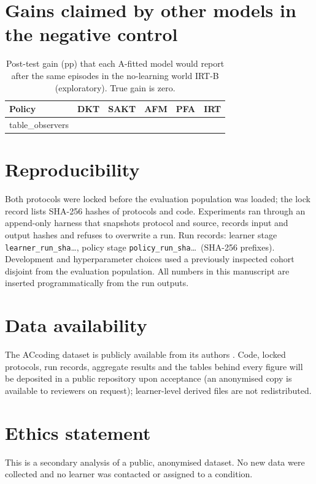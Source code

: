 \documentclass[a4paper,preprint,12pt,authoryear]{elsarticle}
\begin{document}
\section{Gains claimed by other models in the negative control}\label{app:observers}

\begin{table}[H]
\centering
\caption{Post-test gain (pp) that each A-fitted model would report after the same episodes in the no-learning world IRT-B (exploratory). True gain is zero.}
\label{tab:observers}
\small
\begin{tabular}{lrrrrr}
\toprule
Policy & DKT & SAKT & AFM & PFA & IRT \\
\midrule
{{table_observers}}
\bottomrule
\end{tabular}
\end{table}

\section{Reproducibility}\label{app:repro}

Both protocols were locked before the evaluation population was loaded; the lock record lists SHA-256 hashes of protocols and code. Experiments ran through an append-only harness that snapshots protocol and source, records input and output hashes and refuses to overwrite a run. Run records: learner stage \texttt{{{learner_run_sha}}}\ldots, policy stage \texttt{{{policy_run_sha}}}\ldots\ (SHA-256 prefixes). Development and hyperparameter choices used a previously inspected cohort disjoint from the evaluation population. All numbers in this manuscript are inserted programmatically from the run outputs.

\section*{Data availability}
The ACcoding dataset is publicly available from its authors \citep{sun2026accodingdata,chen2024accoding}. Code, locked protocols, run records, aggregate results and the tables behind every figure will be deposited in a public repository upon acceptance (an anonymised copy is available to reviewers on request); learner-level derived files are not redistributed.

\section*{Ethics statement}
This is a secondary analysis of a public, anonymised dataset. No new data were collected and no learner was contacted or assigned to a condition.
\end{document}
